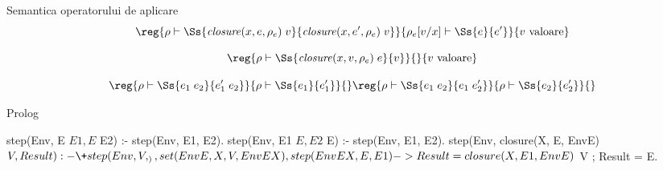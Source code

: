 \documentclass[xcolor=x11names,compress,10pt]{beamer}
\begin{document}
\begin{frame}[fragile]{Semantica operatorului de aplicare}
	\[\reg{\rho \vdash \Ss{{\it closure}(x, e, \rho_e) \; v}{{\it closure}(x, e', \rho_e) \; v}}{\rho_e[v/x]\vdash \Ss{e}{e'}}{v \mbox{ valoare}}\]

	\[\reg{\rho \vdash \Ss{{\it closure}(x, v, \rho_e) \; e}{v}}{}{v \mbox{ valoare}}\]

  \[\reg{\rho \vdash \Ss{e_1 \; e_2}{e'_1 \; e_2}}{\rho \vdash \Ss{e_1}{e'_1}}{}
    \hfill
    \reg{\rho \vdash \Ss{e_1 \; e_2}{e_1 \; e'_2}}{\rho \vdash \Ss{e_2}{e'_2}}{}
    \]

  \begin{block}{Prolog}
    \begin{asciipl}
      step(Env, E $ E1, E $ E2) :- step(Env, E1, E2).
      step(Env, E1 $ E, E2 $ E) :- step(Env, E1, E2).
      step(Env, closure(X, E, EnvE) $ V, Result) :-
          \+ step(Env, V, _),
          set(EnvE, X, V, EnvEX),
          step(EnvEX, E, E1)
          ->  Result = closure(X, E1, EnvE) $ V
          ;   Result = E.
    \end{asciipl}
  \end{block}

\end{frame}



\begin{frame}
\begin{center}
\end{center}
\end{frame}



\end{document}
